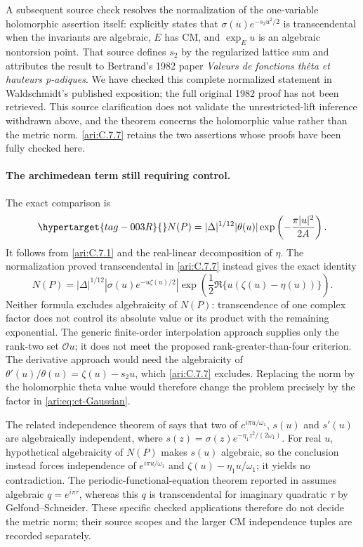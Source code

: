 A subsequent source check resolves the normalization of the
one-variable holomorphic assertion itself:
\citet[p.~15-03]{waldschmidt1988theta} explicitly states that
$\sigma(u)e^{-s_2u^2/2}$ is transcendental when the invariants
are algebraic, $E$ has CM, and $\exp_Eu$ is an algebraic
nontorsion point.  That source defines $s_2$ by the regularized
lattice sum and attributes the result to Bertrand's 1982
paper \emph{Valeurs de fonctions th\^eta et hauteurs p-adiques}.
We have checked this complete normalized statement in
Waldschmidt's published exposition; the full original 1982
proof has not been retrieved.  This source clarification
does not validate the unrestricted-lift inference withdrawn
above, and the theorem concerns the holomorphic value rather
than the metric norm.  \ref{ari:C.7.7} retains the two assertions whose
proofs have been fully checked here.

\paragraph{The archimedean term still requiring control.}
The exact comparison is
\begin{equation}\hypertarget{tag-003R}{}\label{ari:eq:ct-Gaussian}
 N(P)=|\Delta|^{1/12}|\theta(u)|
                         \exp\left(-\frac{\pi|u|^2}{2A}\right).
\end{equation}
It follows from \ref{ari:C.7.1} and the real-linear decomposition of
$\eta$. The normalization proved transcendental in \ref{ari:C.7.7} instead
gives the exact identity
\[
 N(P)=|\Delta|^{1/12}
 \left|\sigma(u)e^{-u\zeta(u)/2}\right|
 \exp\left(\frac12\Re\{u(\zeta(u)-\eta(u))\}\right).
\]
Neither formula excludes algebraicity of $N(P)$: transcendence
of one complex factor does not control its absolute value or
its product with the remaining exponential.
The generic finite-order interpolation approach
supplies only the rank-two set $\mathcal O u$; it does not
meet the proposed rank-greater-than-four criterion. The
derivative approach would need the algebraicity of
$\theta'(u)/\theta(u)=\zeta(u)-s_2u$, which \ref{ari:C.7.7} excludes.
Replacing the norm by the holomorphic theta value would
therefore change the problem precisely by the factor in
\eqref{ari:eq:ct-Gaussian}.

The related independence theorem of
\citet[Corollary~2]{reyssat1982weierstrass} says that two of
$e^{i\pi u/\omega_1}$, $s(u)$ and $s'(u)$ are algebraically
independent, where $s(z)=\sigma(z)e^{-\eta_1z^2/(2\omega_1)}$.
For real $u$, hypothetical algebraicity of $N(P)$ makes
$s(u)$ algebraic, so the conclusion instead forces independence
of $e^{i\pi u/\omega_1}$ and
$\zeta(u)-\eta_1u/\omega_1$; it yields no contradiction.
The periodic-functional-equation theorem reported in
\citet[p.~15-05]{waldschmidt1988theta} assumes algebraic
$q=e^{i\pi\tau}$, whereas this $q$ is transcendental for
imaginary quadratic $\tau$ by Gelfond--Schneider.  These
specific checked applications therefore do not decide the
metric norm; their source scopes and the larger CM
independence tuples are recorded separately.

